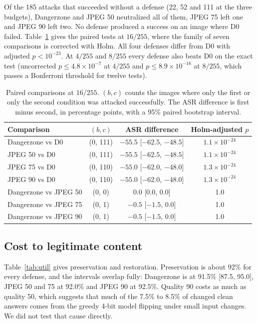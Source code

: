 \documentclass[11pt]{article}
\begin{document}
Of the 185 attacks that succeeded without a defense (22, 52 and 111 at the three
budgets), Dangerzone and JPEG 50 neutralized all of them, JPEG 75 left one and JPEG 90
left two. No defense produced a success on an image where D0 failed.
Table~\ref{tab:tests} gives the paired tests at $16/255$, where the family of seven
comparisons is corrected with Holm. All four defenses differ from D0 with adjusted
$p<10^{-23}$. At $4/255$ and $8/255$ every defense also beats D0 on the exact test
(uncorrected $p\le 4.8\times10^{-7}$ at $4/255$ and $p\le 8.9\times10^{-16}$ at
$8/255$, which passes a Bonferroni threshold for twelve tests).

\begin{table}[t]
\centering
\caption{Paired comparisons at $16/255$. $(b,c)$ counts the images where only the first
or only the second condition was attacked successfully. The ASR difference is
first minus second, in percentage points, with a 95\% paired bootstrap interval.}
\label{tab:tests}
\begin{tabular}{lccc}
\toprule
Comparison & $(b,c)$ & ASR difference & Holm-adjusted $p$ \\
\midrule
Dangerzone vs D0 & (0, 111) & $-55.5$ [$-62.5$, $-48.5$] & $1.1\times10^{-24}$ \\
JPEG 50 vs D0    & (0, 111) & $-55.5$ [$-62.5$, $-48.5$] & $1.1\times10^{-24}$ \\
JPEG 75 vs D0    & (0, 110) & $-55.0$ [$-62.0$, $-48.0$] & $1.3\times10^{-24}$ \\
JPEG 90 vs D0    & (0, 110) & $-55.0$ [$-62.0$, $-48.0$] & $1.3\times10^{-24}$ \\
Dangerzone vs JPEG 50 & (0, 0) & $0.0$ [0.0, 0.0] & 1.0 \\
Dangerzone vs JPEG 75 & (0, 1) & $-0.5$ [$-1.5$, 0.0] & 1.0 \\
Dangerzone vs JPEG 90 & (0, 1) & $-0.5$ [$-1.5$, 0.0] & 1.0 \\
\bottomrule
\end{tabular}
\end{table}

\subsection{Cost to legitimate content}
Table~\ref{tab:util} gives preservation and restoration. Preservation is about 92\% for
every defense, and the intervals overlap fully: Dangerzone is at 91.5\% [87.5, 95.0],
JPEG 50 and 75 at 92.0\% and JPEG 90 at 92.5\%. Quality 90 costs as much as quality 50,
which suggests that much of the 7.5\% to 8.5\% of changed clean answers comes from the
greedy 4-bit model flipping under small input changes. We did not test that cause
directly.
\end{document}
